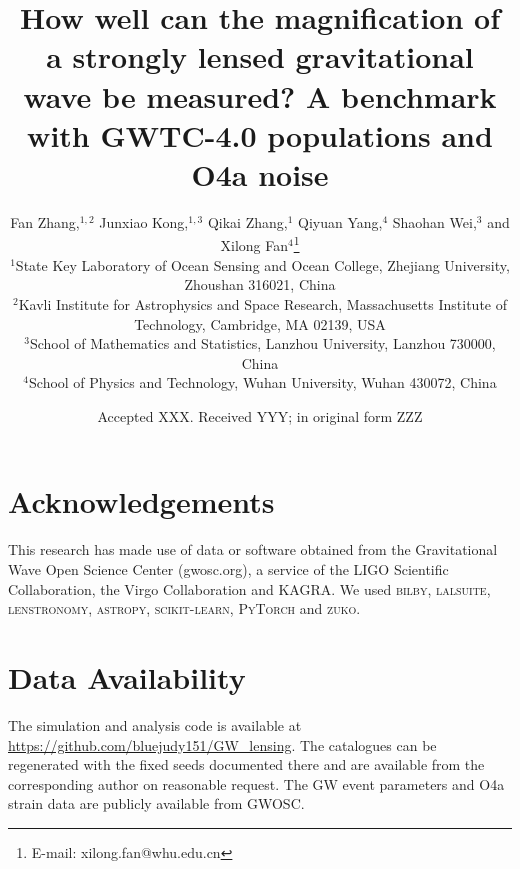 \documentclass[fleqn,usenatbib]{mnras}
\title[Magnification of lensed gravitational waves]{How well can the magnification of a strongly lensed gravitational wave be measured? A benchmark with GWTC-4.0 populations and O4a noise}
\author[Zhang et al.]{Fan Zhang,$^{1,2}$ Junxiao Kong,$^{1,3}$ Qikai Zhang,$^{1}$ Qiyuan Yang,$^{4}$ Shaohan Wei,$^{3}$ and Xilong Fan$^{4}$\thanks{E-mail: xilong.fan@whu.edu.cn}\\
$^{1}$State Key Laboratory of Ocean Sensing and Ocean College, Zhejiang University, Zhoushan 316021, China\\
$^{2}$Kavli Institute for Astrophysics and Space Research, Massachusetts Institute of Technology, Cambridge, MA 02139, USA\\
$^{3}$School of Mathematics and Statistics, Lanzhou University, Lanzhou 730000, China\\
$^{4}$School of Physics and Technology, Wuhan University, Wuhan 430072, China}
\date{Accepted XXX. Received YYY; in original form ZZZ}
\begin{document}
\label{firstpage}
\pagerange{\pageref{firstpage}--\pageref{lastpage}}
\maketitle







\section*{Acknowledgements}
This research has made use of data or software obtained from the Gravitational Wave Open Science Center (gwosc.org), a service of the LIGO Scientific Collaboration, the Virgo Collaboration and KAGRA. We used \textsc{bilby}, \textsc{lalsuite}, \textsc{lenstronomy}, \textsc{astropy}, \textsc{scikit-learn}, \textsc{PyTorch} and \textsc{zuko}.

\section*{Data Availability}
The simulation and analysis code is available at \url{https://github.com/bluejudy151/GW_lensing}. The catalogues can be regenerated with the fixed seeds documented there and are available from the corresponding author on reasonable request. The GW event parameters and O4a strain data are publicly available from GWOSC.



\appendix


\bsp
\label{lastpage}
\end{document}
